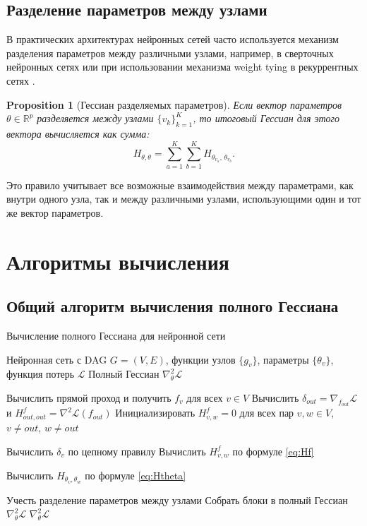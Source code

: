 \documentclass[11pt]{article}
\newtheorem{proposition}{Proposition}
\newcommand{\Ch}{\mathrm{Ch}} %
\begin{document}
\subsection{Разделение параметров между узлами}

В практических архитектурах нейронных сетей часто используется механизм разделения параметров между
различными узлами, например, в сверточных нейронных сетях или при использовании механизма weight tying в
рекуррентных сетях \citep{pascanu2013difficulty}.

\begin{proposition}[Гессиан разделяемых параметров]
  Если вектор параметров $\theta\in\mathbb{R}^p$ разделяется между узлами $\{v_k\}_{k=1}^K$, то итоговый
  Гессиан для этого вектора вычисляется как сумма:
  \[
    H_{\theta,\theta}
    = \sum_{a=1}^K\sum_{b=1}^K
    H_{\theta_{v_a},\,\theta_{v_b}}.
  \]
\end{proposition}

Это правило учитывает все возможные взаимодействия между параметрами, как внутри одного узла, так и между
различными узлами, использующими один и тот же вектор параметров.

\newpage

\section{Алгоритмы вычисления}

\subsection{Общий алгоритм вычисления полного Гессиана}

\begin{algorithm}
  \caption{Вычисление полного Гессиана для нейронной сети}
  \begin{algorithmic}[1]

    \Require Нейронная сеть с DAG $G=(V,E)$, функции узлов $\{g_v\}$, параметры $\{\theta_v\}$, функция
    потерь $\mathcal{L}$
    \Ensure Полный Гессиан $\nabla^2_\theta \mathcal{L}$

    \State Вычислить прямой проход и получить $f_v$ для всех $v \in V$
    \State Вычислить $\delta_{out} = \nabla_{f_{out}} \mathcal{L}$ и $H^f_{out,out} = \nabla^2 \mathcal{L}(f_{out})$
    \State Инициализировать $H^f_{v,w} = 0$ для всех пар $v,w \in V$, $v \neq out$, $w \neq out$

    \State Вычислить $\delta_v$ по цепному правилу
    \For{$w \in V$ такие, что $\Ch(v) \cap \Ch(w) \neq \emptyset$}
    \State Вычислить $H^f_{v,w}$ по формуле \eqref{eq:Hf}
    \EndFor
    \EndFor

    \State Вычислить $H_{\theta_v, \theta_w}$ по формуле \eqref{eq:Htheta}
    \EndFor
    \EndFor

    \State Учесть разделение параметров между узлами
    \State Собрать блоки в полный Гессиан $\nabla^2_\theta \mathcal{L}$
    \State \Return $\nabla^2_\theta \mathcal{L}$
  \end{algorithmic}
\end{algorithm}
\end{document}
